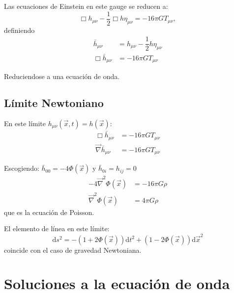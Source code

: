 \documentclass[../main]{subfiles}
\begin{document}
Las ecuaciones de Einstein en este gauge se reducen a:
\begin{equation}
    \Box h_{\mu\nu}-\dfrac{1}{2}\Box h \eta_{\mu\nu}=-16\pi G T_{\mu\nu},
\end{equation}
definiendo 
\begin{equation}
    \begin{split}
        \bar{h}_{\mu\nu}&=h_{\mu\nu}-\dfrac{1}{2}h \eta_{\mu\nu} \\
        \Box \bar{h}_{\mu\nu}&=-16\pi G T_{\mu\nu}
    \end{split}
\end{equation}

Reduciendose a una ecuación de onda.

\subsection{Límite Newtoniano}

En este límite $h_{\mu\nu}(\vec{x}, t)=h(\vec{x})$:
\begin{equation}
    \begin{split}
        \Box \bar{h}_{\mu\nu}&=-16\pi G T_{\mu\nu} \\
        \vec{\nabla} \bar{h}_{\mu\nu}&=-16\pi G T_{\mu\nu}
    \end{split}
\end{equation}

Escogiendo: $\bar{h}_{00}=-4\Phi(\vec{x})$ y $\bar{h}_{0i}=h_{ij}=0$
\begin{equation}
    \begin{split}
        -4\vec{\nabla}^2 \Phi (\vec{x})&=-16\pi G\rho \\
        \vec{\nabla}^2 \Phi(\vec{x})&=4\pi G\rho
    \end{split}
\end{equation}
que es la ecuación de Poisson.

El elemento de línea en este límite:
\begin{equation}
    \mathrm{d}s^2=-(1+2\Phi(\vec{x}))\mathrm{d}t^2+(1-2\Phi(\vec{x}))\mathrm{d}\vec{x}^2
\end{equation}
coincide con el caso de gravedad Newtoniana.

\section{Soluciones a la ecuación de onda}
\end{document}
